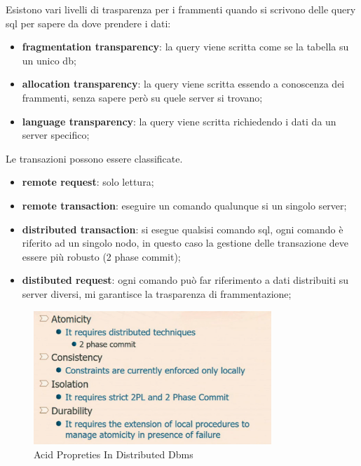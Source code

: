 \documentclass[12pt]{article}
\begin{document}
Esistono vari livelli di trasparenza per i frammenti quando si scrivono delle query sql per sapere da dove prendere i dati:
\begin{itemize}
    \item \textbf{fragmentation transparency}: la query viene scritta come se la tabella su un unico db;
    \item \textbf{allocation transparency}: la query viene scritta essendo a conoscenza dei frammenti, senza sapere per\`o su quele server si trovano;
    \item \textbf{language transparency}: la query viene scritta richiedendo i dati da un server specifico;
\end{itemize}
Le transazioni possono essere classificate.
\begin{itemize}
    \item \textbf{remote request}: solo lettura;
    \item \textbf{remote transaction}: eseguire un comando qualunque si un singolo server;
    \item \textbf{distributed transaction}: si esegue qualsisi comando sql, ogni comando \`e riferito ad un singolo nodo, in questo caso la gestione delle transazione deve essere pi\`u robusto (2 phase commit);
    \item \textbf{distibuted request}: ogni comando pu\`o far riferimento a dati distribuiti su server diversi, mi garantisce la trasparenza di frammentazione;
\end{itemize}



\begin{figure}[H]
    \centering
    \includegraphics[width=0.8\textwidth]{acid-propreties-in-distributed-dbms.png}
    \caption{Acid Propreties In Distributed Dbms}
    \label{fig:acid-propreties-in-distributed-dbms}
\end{figure}
\end{document}
